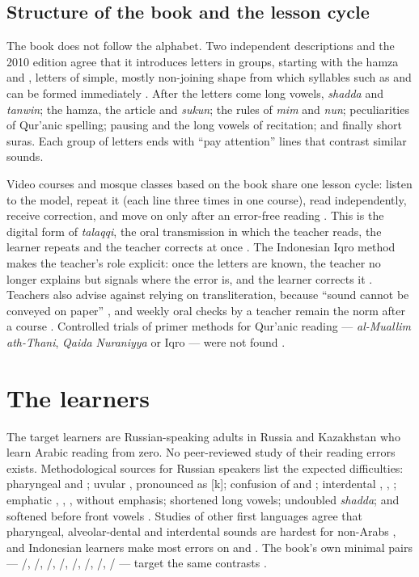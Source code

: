 \subsection{Structure of the book and the lesson cycle}

The book does not follow the alphabet. Two independent descriptions and the 2010 edition agree that it
introduces letters in groups, starting with the hamza and , letters of simple, mostly non-joining
shape from which syllables such as  and  can be formed immediately
\cite{SRC-021,SRC-040}. After the letters come long vowels, \emph{shadda} and \emph{tanwin}; the hamza,
the article and \emph{sukun}; the rules of \emph{mim} and \emph{nun}; peculiarities of Qur'anic spelling;
pausing and the long vowels of recitation; and finally short suras. Each group of letters ends with ``pay
attention'' lines that contrast similar sounds.

Video courses and mosque classes based on the book share one lesson cycle: listen to the model, repeat it
(each line three times in one course), read independently, receive correction, and move on only after an
error-free reading \cite{SRC-021,SRC-022}. This is the digital form of \emph{talaqqi}, the oral transmission
in which the teacher reads, the learner repeats and the teacher corrects at once \cite{SRC-058}. The
Indonesian Iqro method makes the teacher's role explicit: once the letters are known, the teacher no longer
explains but signals where the error is, and the learner corrects it \cite{SRC-057}. Teachers also advise
against relying on transliteration, because ``sound cannot be conveyed on paper'' \cite{SRC-021,SRC-022},
and weekly oral checks by a teacher remain the norm after a course \cite{SRC-039}. Controlled trials of
primer methods for Qur'anic reading --- \emph{al-Muallim ath-Thani}, \emph{Qaida Nuraniyya} or Iqro --- were not
found \cite{SRC-038}.

\section{The learners}\label{sec:lr-learners}

The target learners are Russian-speaking adults in Russia and Kazakhstan who learn Arabic reading from
zero. No peer-reviewed study of their reading errors exists. Methodological sources for Russian speakers
list the expected difficulties: pharyngeal  and ; uvular , pronounced as [k]; confusion of
 and ; interdental , , ; emphatic , , ,  without
emphasis; shortened long vowels; undoubled \emph{shadda}; and  softened before front vowels
\cite{SRC-023}. Studies of other first languages agree that pharyngeal, alveolar-dental and interdental
sounds are hardest for non-Arabs \cite{SRC-034}, and Indonesian learners make most errors on  and
 \cite{SRC-035}. The book's own minimal pairs --- /, /, /,
/, /, /, /, / --- target the same contrasts
\cite{SRC-040}.

